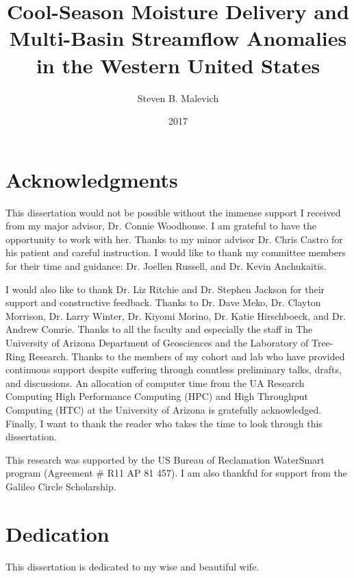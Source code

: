 \documentclass[final, double]{ua-thesis}
\author{Steven B. Malevich}
\title{Cool-Season Moisture Delivery and Multi-Basin Streamflow Anomalies in the Western United States}
\date{2017}
\begin{document}
\maketitle

\chapter*{Acknowledgments}

This dissertation would not be possible without the immense support I received from my major advisor, Dr. Connie Woodhouse. I am grateful to have the opportunity to work with her. Thanks to my minor advisor Dr. Chris Castro for his patient and careful instruction. I would like to thank my committee members for their time and guidance: Dr. Joellen Russell, and Dr. Kevin Anchukaitis.

I would also like to thank Dr. Liz Ritchie and Dr. Stephen Jackson for their support and constructive feedback. Thanks to Dr. Dave Meko, Dr. Clayton Morrison, Dr. Larry Winter, Dr. Kiyomi Morino, Dr. Katie Hirschboeck, and Dr. Andrew Comrie. Thanks to all the faculty and especially the staff in The University of Arizona Department of Geosciences and the Laboratory of Tree-Ring Research. Thanks to the members of my cohort and lab who have provided continuous support despite suffering through countless preliminary talks, drafts, and discussions. An allocation of computer time from the UA Research Computing High Performance Computing (HPC) and High Throughput Computing (HTC) at the University of Arizona is gratefully acknowledged. Finally, I want to thank the reader who takes the time to look through this dissertation.

This research was supported by the US Bureau of Reclamation WaterSmart program (Agreement \# R11 AP 81 457). I am also thankful for support from the Galileo Circle Scholarship. 

\chapter*{Dedication}
This dissertation is dedicated to my wise and beautiful wife.

\tableofcontents
\listoffigures
\listoftables
\end{document}
